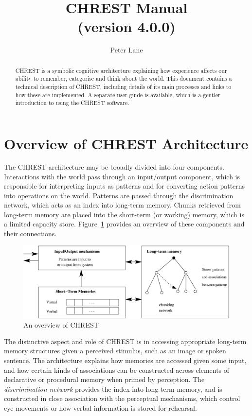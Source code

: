 \documentclass{article}
\title{CHREST Manual \\ (version 4.0.0)}
\author{Peter Lane}
\begin{document}
\maketitle

\begin{abstract}

\noindent CHREST is a symbolic cognitive architecture explaining how experience
affects our ability to remember, categorise and think about the world.  This
document contains a technical description of CHREST, including details of its
main processes and links to how these are implemented.  A separate user guide
is available, which is a gentler introduction to using the CHREST software.

\end{abstract}

\tableofcontents
\newpage

\section{Overview of CHREST Architecture}

The CHREST architecture may be broadly divided into four components.
Interactions with the world pass through an input/output component, which is
responsible for interpreting inputs as patterns and for converting action
patterns into operations on the world.  Patterns are passed through the
discrimination network, which acts as an index into long-term memory.  Chunks
retrieved from long-term memory are placed into the short-term (or working)
memory, which is a limited capacity store.  Figure~\ref{chrest-architecture}
provides an overview of these components and their connections.

\begin{figure}
\includegraphics[width=\textwidth]{figures/chrest.eps}
\caption{An overview of CHREST}
\label{chrest-architecture}
\end{figure}

The distinctive aspect and role of CHREST is in accessing appropriate long-term
memory structures given a perceived stimulus, such as an image or spoken
sentence.  The architecture explains how memories are accessed given some
input, and how certain kinds of associations can be constructed across elements
of declarative or procedural memory when primed by perception.  The {\em
discrimination network} provides the index into long-term memory, and is constructed
in close association with the perceptual mechanisms, which control eye
movements or how verbal information is stored for rehearsal.
\end{document}
